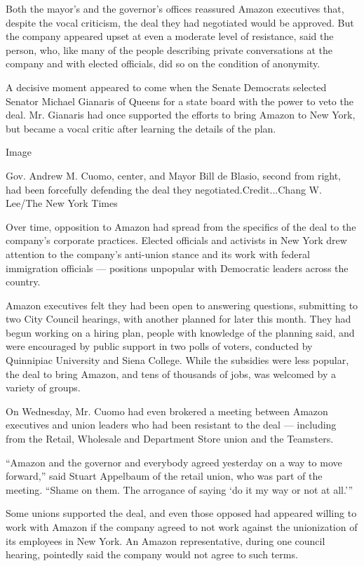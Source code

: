 Both the mayor's and the governor's offices reassured Amazon executives
that, despite the vocal criticism, the deal they had negotiated would be
approved. But the company appeared upset at even a moderate level of
resistance, said the person, who, like many of the people describing
private conversations at the company and with elected officials, did so
on the condition of anonymity.

A decisive moment appeared to come when the Senate Democrats selected
Senator Michael Gianaris of Queens for a state board with the power to
veto the deal. Mr. Gianaris had once supported the efforts to bring
Amazon to New York, but became a vocal critic after learning the details
of the plan.

Image

Gov. Andrew M. Cuomo, center, and Mayor Bill de Blasio, second from
right, had been forcefully defending the deal they
negotiated.Credit...Chang W. Lee/The New York Times

Over time, opposition to Amazon had spread from the specifics of the
deal to the company's corporate practices. Elected officials and
activists in New York drew attention to the company's anti-union stance
and its work with federal immigration officials --- positions unpopular
with Democratic leaders across the country.

Amazon executives felt they had been open to answering questions,
submitting to two City Council hearings, with another planned for later
this month. They had begun working on a hiring plan, people with
knowledge of the planning said, and were encouraged by public support in
two polls of voters, conducted by Quinnipiac University and Siena
College. While the subsidies were less popular, the deal to bring
Amazon, and tens of thousands of jobs, was welcomed by a variety of
groups.

On Wednesday, Mr. Cuomo had even brokered a meeting between Amazon
executives and union leaders who had been resistant to the deal ---
including from the Retail, Wholesale and Department Store union and the
Teamsters.

``Amazon and the governor and everybody agreed yesterday on a way to
move forward,'' said Stuart Appelbaum of the retail union, who was part
of the meeting. ``Shame on them. The arrogance of saying `do it my way
or not at all.'''

Some unions supported the deal, and even those opposed had appeared
willing to work with Amazon if the company agreed to not work against
the unionization of its employees in New York. An Amazon representative,
during one council hearing, pointedly said the company would not agree
to such terms.

